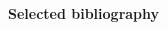 \documentclass[final,svgnames,dvipsnames,table]{beamer}
\begin{document}
\begin{frame}[fragile]
\begin{columns}[t,totalwidth=\textwidth]
\begin{column}{0.32\linewidth}
\begin{alertblock}{\bf Selected bibliography}
      
      
  
  \end{alertblock}
    \end{column}
    \end{columns}

\end{frame}
\end{document}
